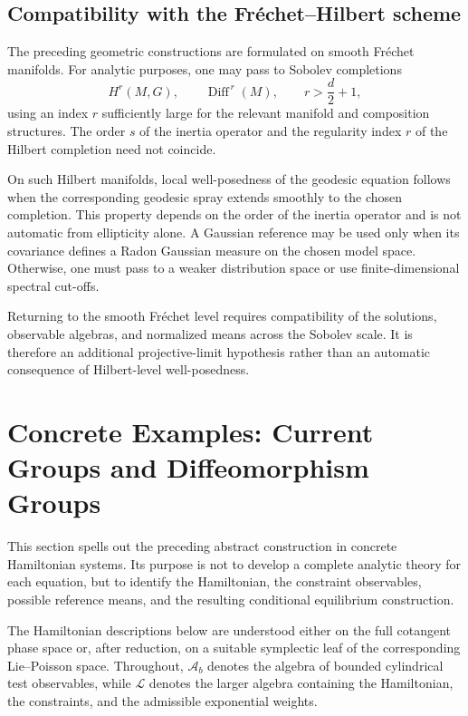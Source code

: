 \documentclass[11pt,reqno]{amsart}
\begin{document}
\subsection{Compatibility with the Fréchet--Hilbert scheme}

The preceding geometric constructions are formulated on smooth
Fréchet manifolds. For analytic purposes, one may pass to Sobolev
completions
\[
H^r(M,G),
\qquad
\operatorname{Diff}^{\,r}(M),
\qquad
r>\frac d2+1,
\]
using an index $r$ sufficiently large for the relevant manifold and
composition structures. The order $s$ of the inertia operator and the
regularity index $r$ of the Hilbert completion need not coincide.

On such Hilbert manifolds, local well-posedness of the geodesic equation
follows when the corresponding geodesic spray extends smoothly to the
chosen completion. This property depends on the order of the inertia
operator and is not automatic from ellipticity alone. A Gaussian
reference may be used only when its covariance defines a Radon Gaussian
measure on the chosen model space. Otherwise, one must pass to a weaker
distribution space or use finite-dimensional spectral cut-offs.

Returning to the smooth Fréchet level requires compatibility of the
solutions, observable algebras, and normalized means across the
Sobolev scale. It is therefore an additional projective-limit
hypothesis rather than an automatic consequence of Hilbert-level
well-posedness.
\section{Concrete Examples: Current Groups and Diffeomorphism Groups}

This section spells out the preceding abstract construction in concrete
Hamiltonian systems. Its purpose is not to develop a complete analytic
theory for each equation, but to identify the Hamiltonian, the
constraint observables, possible reference means, and the resulting
conditional equilibrium construction.

The Hamiltonian descriptions below are understood either on the full
cotangent phase space or, after reduction, on a suitable symplectic
leaf of the corresponding Lie--Poisson space. Throughout,
$\mathcal A_b$ denotes the algebra of bounded cylindrical test
observables, while $\mathcal L$ denotes the larger algebra containing
the Hamiltonian, the constraints, and the admissible exponential
weights.
\end{document}
